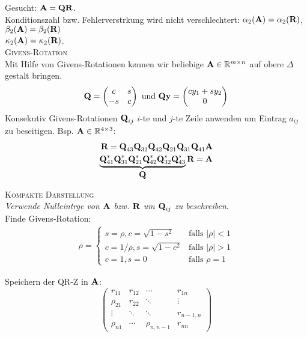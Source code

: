 Gesucht: $\mbox{\bf A}=\mbox{\bf QR}$.\\
Konditionszahl bzw. Fehlerverst\a rkung wird nicht verschlechtert: $\alpha_2(\mbox{\bf A}) = \alpha_2(\mbox{\bf R})$, $\beta_2(\mbox{\bf A}) = \beta_2(\mbox{\bf R})$\\
$\kappa_2(\mbox{\bf A})= \kappa_2(\mbox{\bf R})$.\\

\textsc{Givens-Rotation}\\
Mit Hilfe von Givens-Rotationen k\o nnen wir beliebige $\mbox{\bf A}\in \mathbb{R}^{m \times n}$ auf obere $\Delta$gestalt bringen.
\begin{align*}
\mbox{\bf Q}=\begin{pmatrix}
c & s \\
-s & c
\end{pmatrix}
\text{ und }
\mbox{\bf Qy} = \begin{pmatrix}
cy_1 + sy_2 \\ 0
\end{pmatrix}
\end{align*}
Konsekutiv Givens-Rotationen $\mbox{\bf Q}_{ij}$ $i$-te und $j$-te Zeile anwenden um Eintrag $a_{ij}$ zu beseitigen. Bsp. $\mbox{\bf A} \in \mathbb{R}^{4 \times 3}$:
\begin{align*}
\mbox{\bf R} = \mbox{\bf Q}_{43}\mbox{\bf Q}_{32}\mbox{\bf Q}_{42}\mbox{\bf Q}_{21}\mbox{\bf Q}_{31}\mbox{\bf Q}_{41}\mbox{\bf A} \\
\underbrace{\mbox{\bf Q}_{41}^*\mbox{\bf Q}_{31}^*\mbox{\bf Q}_{21}^*\mbox{\bf Q}_{42}^*\mbox{\bf Q}_{32}^*\mbox{\bf Q}_{43}^*}_{\mbox{\bf Q}}\mbox{\bf R}=\mbox{\bf A}
\end{align*}

\textsc{Kompakte Darstellung}\\
\emph{Verwende Nulleintr\a ge von $\mbox{\bf A}$ bzw. $\mbox{\bf R}$ um $\mbox{\bf Q}_{ij}$ zu beschreiben}.\\
Finde Givens-Rotation:
\begin{align*}
\rho = 
\begin{cases}
s = \rho, c=\sqrt{1-s^2}  &\text{falls $|\rho|<1$} \\
c = 1/\rho, s=\sqrt{1-c^2} &\text{falls $|\rho|>1$} \\
c = 1, s=0 &\text{falls $\rho=1$}
\end{cases}
\end{align*}

Speichern der QR-Z in $\mbox{\bf A}$:
\begin{equation}
\begin{pmatrix}
r_{11} & r_{12} & \cdots    & r_{1n} \\
\rho_{21} & r_{22} & \ddots    & \vdots \\
\vdots & \ddots & \ddots    & r_{n-1,n} \\
\rho_{n1} & \cdots & \rho_{n,n-1} & r_{nn} 
\end{pmatrix}
\end{equation}

